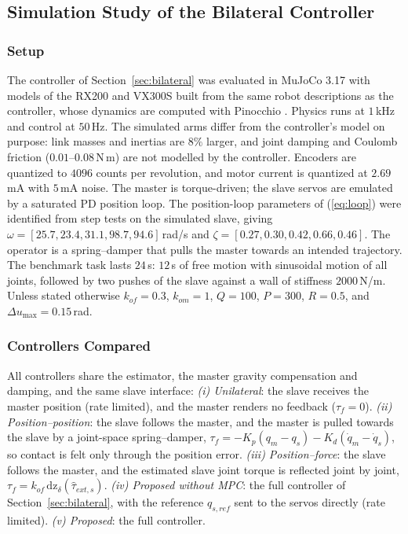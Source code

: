 \documentclass[a4paper, 10pt, conference]{ieeeconf}      %
\begin{document}
\subsection{Simulation Study of the Bilateral Controller}
\label{sec:sim}
\subsubsection{Setup}
The controller of Section~\ref{sec:bilateral} was evaluated in MuJoCo 3.17 with models of the RX200 and VX300S built from the same robot descriptions as the controller, whose dynamics are computed with Pinocchio \cite{carpentier2019pinocchio}. Physics runs at $1$\,kHz and control at $50$\,Hz. The simulated arms differ from the controller's model on purpose: link masses and inertias are $8\%$ larger, and joint damping and Coulomb friction ($0.01$--$0.08$\,N\,m) are not modelled by the controller. Encoders are quantized to $4096$ counts per revolution, and motor current is quantized at $2.69$\,mA with $5$\,mA noise. The master is torque-driven; the slave servos are emulated by a saturated PD position loop. The position-loop parameters of (\ref{eq:loop}) were identified from step tests on the simulated slave, giving $\omega=[25.7,23.4,31.1,98.7,94.6]$\,rad/s and $\zeta=[0.27,0.30,0.42,0.66,0.46]$. The operator is a spring--damper that pulls the master towards an intended trajectory. The benchmark task lasts $24$\,s: $12$\,s of free motion with sinusoidal motion of all joints, followed by two pushes of the slave against a wall of stiffness $2000$\,N/m. Unless stated otherwise $k_{of}=0.3$, $k_{om}=1$, $Q=100$, $P=300$, $R=0.5$, and $\Delta u_{\max}=0.15$\,rad.

\subsubsection{Controllers Compared}
All controllers share the estimator, the master gravity compensation and damping, and the same slave interface:
\textit{(i) Unilateral}: the slave receives the master position (rate limited), and the master renders no feedback ($\tau_f=0$).
\textit{(ii) Position--position}: the slave follows the master, and the master is pulled towards the slave by a joint-space spring--damper, $\tau_f=-K_p(q_m-q_s)-K_d(\dot q_m-\dot q_s)$, so contact is felt only through the position error.
\textit{(iii) Position--force}: the slave follows the master, and the estimated slave joint torque is reflected joint by joint, $\tau_f=k_{of}\,\mathrm{dz}_\delta(\hat\tau_{ext,s})$.
\textit{(iv) Proposed without MPC}: the full controller of Section~\ref{sec:bilateral}, with the reference $q_{s,ref}$ sent to the servos directly (rate limited).
\textit{(v) Proposed}: the full controller.
\end{document}
